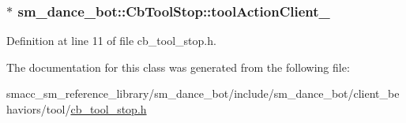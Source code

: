 \subsubsection[{\texorpdfstring{tool\+Action\+Client\+\_\+}{toolActionClient_}}]{$\ast$ sm\+\_\+dance\+\_\+bot\+::\+Cb\+Tool\+Stop\+::tool\+Action\+Client\+\_\+}\hypertarget{classsm__dance__bot_1_1CbToolStop_aa8d9400ae702c970f970980e5d7a13c5}{}\label{classsm__dance__bot_1_1CbToolStop_aa8d9400ae702c970f970980e5d7a13c5}


Definition at line 11 of file cb\+\_\+tool\+\_\+stop.\+h.



The documentation for this class was generated from the following file\+:\begin{DoxyCompactItemize}
\item 
smacc\+\_\+sm\+\_\+reference\+\_\+library/sm\+\_\+dance\+\_\+bot/include/sm\+\_\+dance\+\_\+bot/client\+\_\+behaviors/tool/\hyperlink{cb__tool__stop_8h}{cb\+\_\+tool\+\_\+stop.\+h}\end{DoxyCompactItemize}
